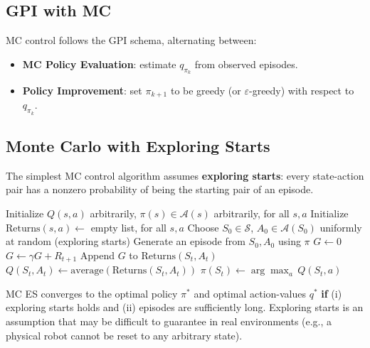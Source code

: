 \documentclass[11pt,a4paper]{article}
\theoremstyle{definition}
\theoremstyle{plain}
\theoremstyle{remark}
\begin{document}
\subsection{GPI with MC}

MC control follows the GPI schema, alternating between:
\begin{itemize}
    \item \textbf{MC Policy Evaluation}: estimate $q_{\pi_k}$ from observed episodes.
    \item \textbf{Policy Improvement}: set $\pi_{k+1}$ to be greedy (or $\varepsilon$-greedy) with respect to $q_{\pi_k}$.
\end{itemize}

\subsection{Monte Carlo with Exploring Starts}

The simplest MC control algorithm assumes \textbf{exploring starts}: every state-action pair has a nonzero probability of being the starting pair of an episode.

\begin{algorithm}
\caption{Monte Carlo ES (Exploring Starts), estimating $\pi \approx \pi_*$}
\begin{algorithmic}
\STATE Initialize $Q(s, a)$ arbitrarily, $\pi(s) \in \mathcal{A}(s)$ arbitrarily, for all $s, a$
\STATE Initialize $\text{Returns}(s, a) \leftarrow$ empty list, for all $s, a$
\LOOP
    \STATE Choose $S_0 \in \mathcal{S}$, $A_0 \in \mathcal{A}(S_0)$ uniformly at random (exploring starts)
    \STATE Generate an episode from $S_0, A_0$ using $\pi$
    \STATE $G \leftarrow 0$
        \STATE $G \leftarrow \gamma G + R_{t+1}$
            \STATE Append $G$ to $\text{Returns}(S_t, A_t)$
            \STATE $Q(S_t, A_t) \leftarrow \text{average}(\text{Returns}(S_t, A_t))$
            \STATE $\pi(S_t) \leftarrow \arg\max_a\, Q(S_t, a)$
        \ENDIF
    \ENDFOR
\ENDLOOP
\end{algorithmic}
\end{algorithm}

\begin{tcolorbox}[colback=green!5!white, colframe=green!60!black, title={Convergence of MC ES}]
MC ES converges to the optimal policy $\pi^*$ and optimal action-values $q^*$ \textbf{if} (i) exploring starts holds and (ii) episodes are sufficiently long. Exploring starts is an assumption that may be difficult to guarantee in real environments (e.g., a physical robot cannot be reset to any arbitrary state).
\end{tcolorbox}
\end{document}
